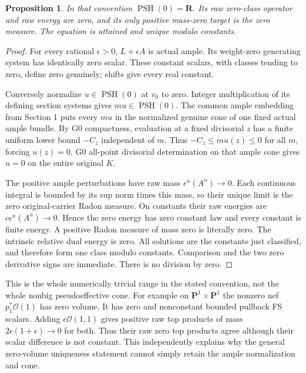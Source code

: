 \documentclass[10pt]{article}
\newtheorem{proposition}[theorem]{Proposition}
\newcommand{\PSH}{\operatorname{PSH}}
\newcommand{\OO}{\mathcal O}
\begin{document}
\begin{proposition}
In that convention $\PSH(0)=\mathbf R$. Its raw zero-class operator
and raw energy are zero, and its only positive mass-zero target is
the zero measure. The equation is attained and unique modulo constants.
\end{proposition}
\begin{proof}
For every rational $\epsilon>0$, $L+\epsilon A$ is actual ample.
Its weight-zero generating system has identically zero scalar.
These constant scalars, with classes tending to zero, define zero
genuinely; shifts give every real constant.

Conversely normalize $u\in\PSH(0)$ at $v_0$ to zero. Integer
multiplication of its defining section systems gives $mu\in\PSH(0)$.
The common ample embedding from Section 1 puts every $mu$ in the
normalized genuine cone of one fixed actual ample bundle.
By G0 compactness, evaluation at a fixed divisorial $z$ has a finite
uniform lower bound $-C_z$ independent of $m$. Thus
$-C_z\leq mu(z)\leq0$ for all $m$, forcing $u(z)=0$.
G0 all-point divisorial determination on that ample cone gives $u=0$
on the entire original $K$.

The positive ample perturbations have raw mass
$\epsilon^n(A^n)\to0$. Each continuous integral is bounded by its
sup norm times this mass, so their unique limit is the zero
original-carrier Radon measure. On constants their raw energies are
$c\epsilon^n(A^n)\to0$. Hence the zero energy has zero constant law
and every constant is finite energy. A positive Radon measure of mass
zero is literally zero. The intrinsic relative dual energy is zero.
All solutions are the constants just classified, and therefore form
one class modulo constants. Comparison and the two zero derivative
signs are immediate. There is no division by zero.
\end{proof}

This is the whole numerically trivial range in the stated convention,
not the whole nonbig pseudoeffective cone. For example on
$\mathbf P^1\times\mathbf P^1$ the nonzero nef
$p_1^*\OO(1)$ has zero volume. It has zero and nonconstant bounded
pullback FS scalars. Adding $\epsilon\OO(1,1)$ gives positive raw
top products of mass $2\epsilon(1+\epsilon)\to0$ for both.
Thus their raw zero top products agree although their scalar difference
is not constant. This independently explains why the general
zero-volume uniqueness statement cannot simply retain the ample
normalization and cone.
\end{document}

